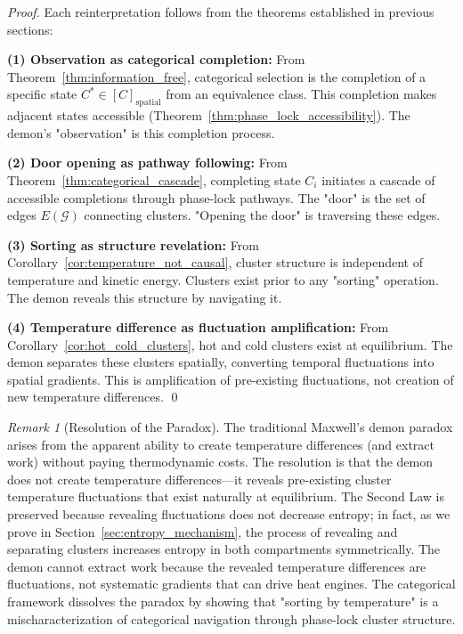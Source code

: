 \documentclass[12pt,a4paper]{article}
\theoremstyle{definition}
\theoremstyle{remark}
\newtheorem{remark}[theorem]{Remark}
\newcommand{\phaselockgraph}{\mathcal{G}}
\begin{document}
\begin{proof}
Each reinterpretation follows from the theorems established in previous sections:

\textbf{(1) Observation as categorical completion:}
From Theorem~\ref{thm:information_free}, categorical selection is the completion of a specific state $C^* \in [C]_{\text{spatial}}$ from an equivalence class. This completion makes adjacent states accessible (Theorem~\ref{thm:phase_lock_accessibility}). The demon's "observation" is this completion process.

\textbf{(2) Door opening as pathway following:}
From Theorem~\ref{thm:categorical_cascade}, completing state $C_i$ initiates a cascade of accessible completions through phase-lock pathways. The "door" is the set of edges $E(\phaselockgraph)$ connecting clusters. "Opening the door" is traversing these edges.

\textbf{(3) Sorting as structure revelation:}
From Corollary~\ref{cor:temperature_not_causal}, cluster structure is independent of temperature and kinetic energy. Clusters exist prior to any "sorting" operation. The demon reveals this structure by navigating it.

\textbf{(4) Temperature difference as fluctuation amplification:}
From Corollary~\ref{cor:hot_cold_clusters}, hot and cold clusters exist at equilibrium. The demon separates these clusters spatially, converting temporal fluctuations into spatial gradients. This is amplification of pre-existing fluctuations, not creation of new temperature differences. \qed
\end{proof}

\begin{remark}[Resolution of the Paradox]
\label{rem:paradox_resolution_temperature}
The traditional Maxwell's demon paradox arises from the apparent ability to create temperature differences (and extract work) without paying thermodynamic costs. The resolution is that the demon does not create temperature differences—it reveals pre-existing cluster temperature fluctuations that exist naturally at equilibrium. The Second Law is preserved because revealing fluctuations does not decrease entropy; in fact, as we prove in Section~\ref{sec:entropy_mechanism}, the process of revealing and separating clusters increases entropy in both compartments symmetrically. The demon cannot extract work because the revealed temperature differences are fluctuations, not systematic gradients that can drive heat engines. The categorical framework dissolves the paradox by showing that "sorting by temperature" is a mischaracterization of categorical navigation through phase-lock cluster structure.
\end{remark}
\end{document}
